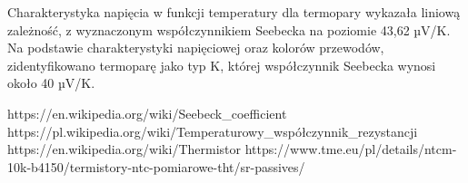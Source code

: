 \documentclass[11pt]{article}
\begin{document}
    \indent Charakterystyka napięcia w funkcji temperatury dla termopary wykazała liniową zależność, z wyznaczonym współczynnikiem
    Seebecka na poziomie 43,62 µV/K.\\
    \indent Na podstawie charakterystyki napięciowej oraz kolorów przewodów, zidentyfikowano termoparę jako typ K, której współczynnik
    Seebecka wynosi około 40 µV/K.
    \vfill
    \footnotesize
    \begin{thebibliography}{3}
        https://en.wikipedia.org/wiki/Seebeck\_coefficient
        https://pl.wikipedia.org/wiki/Temperaturowy\_współczynnik\_rezystancji
        https://en.wikipedia.org/wiki/Thermistor
        https://www.tme.eu/pl/details/ntcm-10k-b4150/termistory-ntc-pomiarowe-tht/sr-passives/

    \end{thebibliography}
\end{document}
